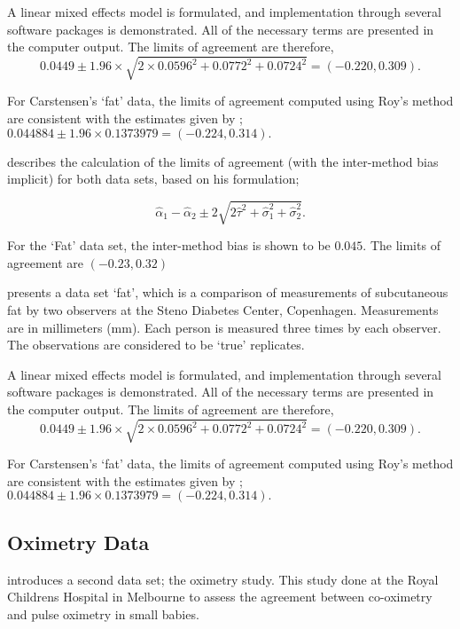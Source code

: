 \documentclass[12pt, a4paper]{report}
\theoremstyle{plain}
\theoremstyle{definition}
\theoremstyle{remark}
\begin{document}
	A linear mixed effects model is formulated, and implementation through several software packages is demonstrated.
	All of the necessary terms are presented in the computer output. The limits of agreement are therefore,
	\begin{equation}
	0.0449  \pm 1.96 \times  \sqrt{2 \times 0.0596^2 + 0.0772^2 + 0.0724^2} = (-0.220,  0.309).
	\end{equation}
	
	For Carstensen's `fat' data, the limits of agreement computed using Roy's
	method are consistent with the estimates given by \citet{BXC2008}; $0.044884  \pm 1.96 \times  0.1373979 = (-0.224,  0.314).$	
	
		
	\citet{BXC2008} describes the calculation of the limits of agreement (with the inter-method bias implicit) for both data sets, based on his formulation;
	
	\[\hat{\alpha}_1 - \hat{\alpha}_2 \pm 2\sqrt{2\hat{\tau}^2 +\hat{\sigma}_1^2 +\hat{\sigma}_2^2 }.\]
	
	For the `Fat' data set, the inter-method bias is shown to be $0.045$. The limits of agreement are $(-0.23 , 0.32)$
	
	
	\citet{BXC2008} presents a data set `fat', which is a comparison of measurements of subcutaneous fat
	by two observers at the Steno Diabetes Center, Copenhagen. Measurements are in millimeters
	(mm). Each person is measured three times by each observer. The observations are considered to be `true' replicates.
	
	A linear mixed effects model is formulated, and implementation through several software packages is demonstrated.
	All of the necessary terms are presented in the computer output. The limits of agreement are therefore,
	\begin{equation}
	0.0449  \pm 1.96 \times  \sqrt{2 \times 0.0596^2 + 0.0772^2 + 0.0724^2} = (-0.220,  0.309).
	\end{equation}
	
	For Carstensen's `fat' data, the limits of agreement computed using Roy's
	method are consistent with the estimates given by \citet{BXC2008}; $0.044884  \pm 1.96 \times  0.1373979 = (-0.224,  0.314).$
	
	
	\subsection{Oximetry Data}
		\citet{BXC2008} introduces a second data set; the oximetry study. This study done at the Royal Childrens Hospital in
		Melbourne to assess the agreement between co-oximetry and pulse oximetry in small babies.
		
\end{document}
